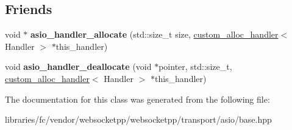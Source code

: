 \subsection*{Friends}
\begin{DoxyCompactItemize}
\item 
\mbox{\label{classwebsocketpp_1_1transport_1_1asio_1_1custom__alloc__handler_a14dd8ffbfb3f9997911fd87b4b6e88d8}} 
void $\ast$ {\bfseries asio\+\_\+handler\+\_\+allocate} (std\+::size\+\_\+t size, \mbox{\hyperlink{classwebsocketpp_1_1transport_1_1asio_1_1custom__alloc__handler}{custom\+\_\+alloc\+\_\+handler}}$<$ Handler $>$ $\ast$this\+\_\+handler)
\item 
\mbox{\label{classwebsocketpp_1_1transport_1_1asio_1_1custom__alloc__handler_a2157a4fc2f17712f09483a1b317dcf3f}} 
void {\bfseries asio\+\_\+handler\+\_\+deallocate} (void $\ast$pointer, std\+::size\+\_\+t, \mbox{\hyperlink{classwebsocketpp_1_1transport_1_1asio_1_1custom__alloc__handler}{custom\+\_\+alloc\+\_\+handler}}$<$ Handler $>$ $\ast$this\+\_\+handler)
\end{DoxyCompactItemize}


The documentation for this class was generated from the following file\+:\begin{DoxyCompactItemize}
\item 
libraries/fc/vendor/websocketpp/websocketpp/transport/asio/base.\+hpp\end{DoxyCompactItemize}

